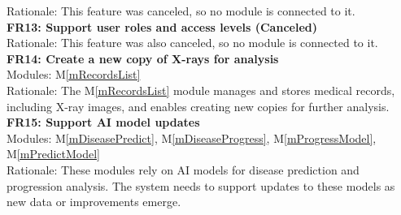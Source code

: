 \documentclass[12pt, titlepage]{article}
\newcommand{\mref}[1]{M\ref{#1}}
\begin{document}
Rationale: This feature was canceled, so no module is connected to it. \\
\newline
\textbf{FR13: Support user roles and access levels (Canceled)} \\
Rationale: This feature was also canceled, so no module is connected to it. \\
\newline
\textbf{FR14: Create a new copy of X-rays for analysis} \\
Modules: \mref{mRecordsList} \\
Rationale: The \mref{mRecordsList} module manages and stores medical records, including X-ray images, and enables creating new copies for further analysis. \\
\newline
\textbf{FR15: Support AI model updates} \\
Modules: \mref{mDiseasePredict}, \mref{mDiseaseProgress}, \mref{mProgressModel}, \mref{mPredictModel} \\
Rationale: These modules rely on AI models for disease prediction and progression analysis. The system needs to support updates to these models as new data or improvements emerge. \\
\newline
\end{document}
